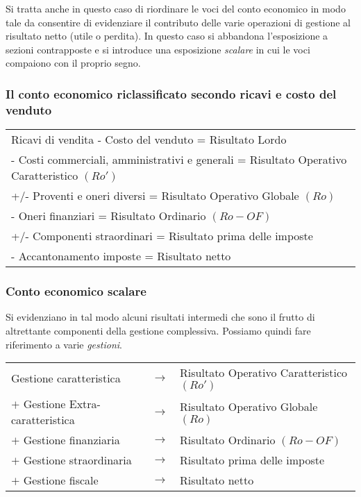 \documentclass[a4paper,portrait,12pt]{article}
\theoremstyle{definition}
\begin{document}
Si tratta anche in questo caso di riordinare le voci del conto economico in modo tale da consentire di evidenziare il contributo delle varie operazioni di gestione al risultato netto (utile o perdita).
In questo caso si abbandona l’esposizione a sezioni contrapposte e si introduce una esposizione \emph{scalare} in cui le voci compaiono con il proprio segno.

\subsubsection{Il conto economico riclassificato secondo ricavi e costo del venduto}

\begin{tabular}{l}
Ricavi di vendita - Costo del venduto = Risultato Lordo\\
- Costi commerciali, amministrativi e generali = Risultato Operativo Caratteristico $(Ro')$\\
+/- Proventi e oneri diversi = Risultato Operativo Globale $(Ro)$\\
- Oneri finanziari = Risultato Ordinario $(Ro - OF)$\\
+/- Componenti straordinari = Risultato prima delle imposte\\
- Accantonamento imposte = Risultato netto\\
\end{tabular}

\subsubsection{Conto economico scalare}
Si evidenziano in tal modo alcuni risultati intermedi
che sono il frutto di altrettante componenti della 
gestione complessiva.
Possiamo quindi fare riferimento a varie \emph{gestioni}.

\begin{table}[H]
\begin{center}
\begin{tabular}{lcl}
Gestione caratteristica & $\rightarrow$ & Risultato Operativo Caratteristico $(Ro')$\\
$+$ Gestione Extra-caratteristica & $\rightarrow$ & Risultato Operativo Globale $(Ro)$\\
$+$ Gestione finanziaria & $\rightarrow$ & Risultato Ordinario $(Ro - OF)$\\
$+$ Gestione straordinaria & $\rightarrow$ & Risultato prima delle imposte\\
$+$ Gestione fiscale & $\rightarrow$ & Risultato netto
\end{tabular}
\end{center}
\end{table}
\end{document}
